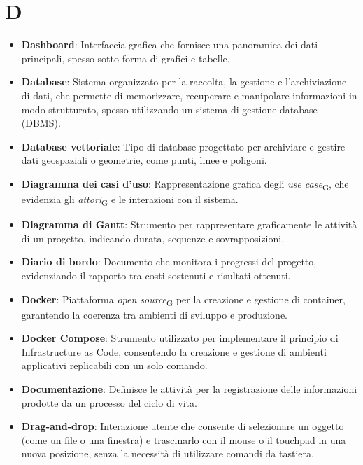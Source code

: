 \section*{D}  
\begin{itemize}
    \item \textbf{Dashboard}: Interfaccia grafica che fornisce una panoramica dei dati principali, spesso sotto forma di grafici e tabelle.
    \item \textbf{Database}: Sistema organizzato per la raccolta, la gestione e l'archiviazione di dati, che permette di memorizzare, recuperare e manipolare informazioni in modo strutturato, spesso utilizzando un sistema di gestione database (DBMS).
    \item \textbf{Database vettoriale}: Tipo di database progettato per archiviare e gestire dati geospaziali o geometrie, come punti, linee e poligoni.
    \item \textbf{Diagramma dei casi d’uso}: Rappresentazione grafica degli \textit{use case}\textsubscript{G}, che evidenzia gli \textit{attori}\textsubscript{G} e le interazioni con il sistema.
    \item \textbf{Diagramma di Gantt}: Strumento per rappresentare graficamente le attività di un progetto, indicando durata, sequenze e sovrapposizioni.
    \item \textbf{Diario di bordo}: Documento che monitora i progressi del progetto, evidenziando il rapporto tra costi sostenuti e risultati ottenuti.
    \item \textbf{Docker}: Piattaforma \textit{open source}\textsubscript{G} per la creazione e gestione di container, garantendo la coerenza tra ambienti di sviluppo e produzione.
    \item \textbf{Docker Compose}: Strumento utilizzato per implementare il principio di Infrastructure as Code, consentendo la creazione e gestione di ambienti applicativi replicabili con un solo comando.
    \item \textbf{Documentazione}: Definisce le attività per la registrazione delle informazioni prodotte da un processo del ciclo di vita.
    \item \textbf{Drag-and-drop}: Interazione utente che consente di selezionare un oggetto (come un file o una finestra) e trascinarlo con il mouse o il touchpad in una nuova posizione, senza la necessità di utilizzare comandi da tastiera.
\end{itemize}

